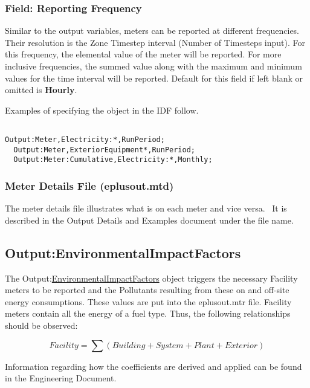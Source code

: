 \subsubsection{Field: Reporting Frequency}\label{field-reporting-frequency-1}

Similar to the output variables, meters can be reported at different frequencies. Their resolution is the Zone Timestep interval (Number of Timesteps input). For this frequency, the elemental value of the meter will be reported. For more inclusive frequencies, the summed value along with the maximum and minimum values for the time interval will be reported. Default for this field if left blank or omitted is \textbf{Hourly}.

Examples of specifying the object in the IDF follow.

\begin{lstlisting}

Output:Meter,Electricity:*,RunPeriod;
  Output:Meter,ExteriorEquipment*,RunPeriod;
  Output:Meter:Cumulative,Electricity:*,Monthly;
\end{lstlisting}

\subsubsection{Meter Details File (eplusout.mtd)}\label{meter-details-file-eplusout.mtd}

The meter details file illustrates what is on each meter and vice versa.~ It is described in the Output Details and Examples document under the file name.

\subsection{Output:EnvironmentalImpactFactors}\label{outputenvironmentalimpactfactors}

The Output:\hyperref[environmentalimpactfactors]{EnvironmentalImpactFactors} object triggers the necessary Facility meters to be reported and the Pollutants resulting from these on and off-site energy consumptions. These values are put into the eplusout.mtr file. Facility meters contain all the energy of a fuel type. Thus, the following relationships should be observed:

\begin{equation}
Facility = \sum {\left( {Building + System + Plant + Exterior} \right)}
\end{equation}

Information regarding how the coefficients are derived and applied can be found in the Engineering Document.

